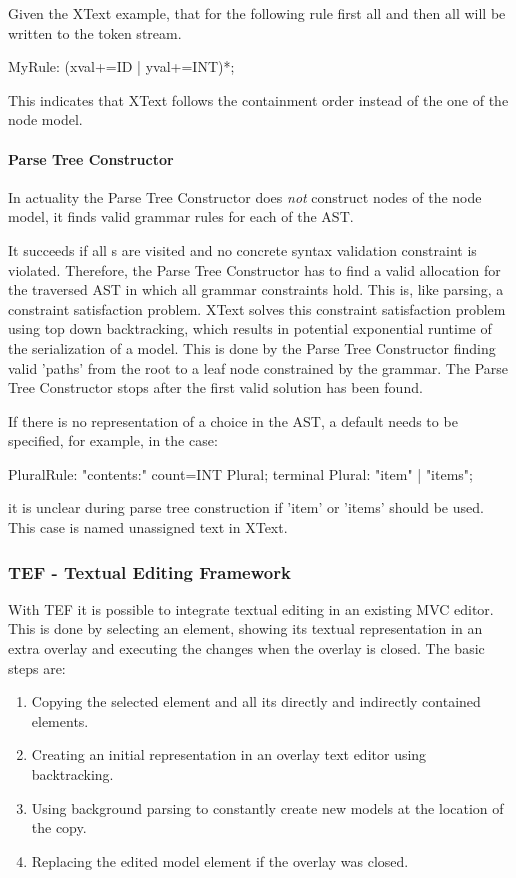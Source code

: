 Given the XText example, that for the following rule first all  and then all  will be written to the token stream.
\begin{xtxt}
MyRule: (xval+=ID | yval+=INT)*; 
\end{xtxt}
This indicates that XText follows the  containment order instead of the one of the node model.

\paragraph{Parse Tree Constructor}  \label{xtxt:ptc}
In actuality the Parse Tree Constructor does \emph{not} construct nodes of the node model, it finds valid grammar rules for each  of the AST. 

It succeeds if all s are visited and no concrete syntax validation constraint is violated. Therefore, the Parse Tree Constructor has to find a valid allocation for the traversed AST in which all grammar constraints hold.  This is, like parsing, a constraint satisfaction problem. XText solves this constraint satisfaction problem using top down backtracking, which results in potential exponential runtime of the serialization of a model. This is done by the Parse Tree Constructor finding valid 'paths' from the root to a leaf node constrained by the grammar. The Parse Tree Constructor stops after the first valid solution has been found. 

If there is no representation of a choice in the AST, a default needs to be specified, for example, in the case: 
\begin{xtxt}
PluralRule: "contents:" count=INT Plural;
terminal Plural: "item" | "items";
\end{xtxt}
it is unclear during parse tree construction if 'item' or 'items' should be used. This case is named unassigned text in XText.



\subsubsection{TEF - Textual Editing Framework}
With TEF it is possible to integrate textual editing in an existing MVC editor. This is done by selecting an element, showing its textual representation in an extra overlay and executing the changes when the overlay is closed. 
The basic steps are:
\begin{enumerate}
	\item Copying the selected element and all its directly and indirectly contained elements.
	\item Creating an initial representation in an overlay text editor using backtracking.
	\item Using background parsing to constantly create new models at the location of the copy.
	\item Replacing the edited model element if the overlay was closed.
\end{enumerate}

